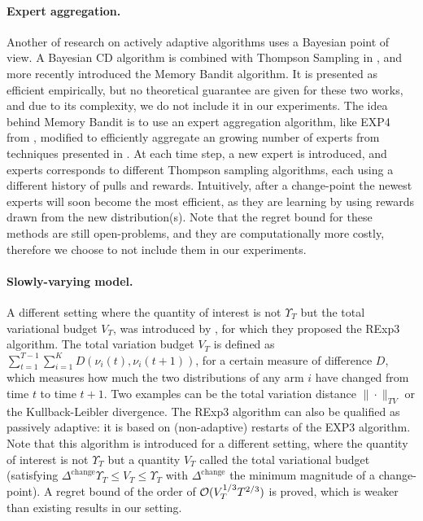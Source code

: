 \paragraph{Expert aggregation.}
%
Another of research on actively adaptive algorithms uses a Bayesian point of view.
A Bayesian CD algorithm is combined with Thompson Sampling in \cite{MellorShapiro13},
and more recently \cite{Alami17} introduced the Memory Bandit algorithm.
It is presented as efficient empirically, but no theoretical guarantee are given for these two works, and due to its complexity, we do not include it in our experiments.
The idea behind Memory Bandit is to use an expert aggregation algorithm, like EXP4 from \cite{Auer02}, modified to efficiently aggregate an growing number of experts from techniques presented in \cite{Mourtada17}.
At each time step, a new expert is introduced, and experts corresponds to different Thompson sampling algorithms, each using a different history of pulls and rewards. Intuitively, after a change-point the newest experts will soon become the most efficient, as they are learning by using rewards drawn from the new distribution(s).
%
Note that the regret bound for these methods are still open-problems,
and they are computationally more costly,
therefore we choose to not include them in our experiments.


\paragraph{Slowly-varying model.}

A different setting where the quantity of interest is not $\Upsilon_T$ but the total variational budget $V_T$, was introduced by \cite{Besbes14stochastic}, for which they proposed the RExp3 algorithm.
The total variation budget $V_T$ is defined as $\sum_{t=1}^{T-1} \sum_{i=1}^K D(\nu_i(t), \nu_i(t+1))$, for a certain measure of difference $D$, which measures how much the two distributions of any arm $i$ have changed from time $t$ to time $t+1$.
Two examples can be the total variation distance $\|\cdot\|_{TV}$ or the Kullback-Leibler divergence.
%
The RExp3 algorithm can also be qualified as passively adaptive: it is based on (non-adaptive) restarts of the EXP3 algorithm. Note that this algorithm is introduced for a different setting, where the quantity of interest is not $\Upsilon_T$ but a quantity $V_T$ called the total variational budget (satisfying $\Delta^{\text{change}} \Upsilon_T \leq V_T \leq \Upsilon_T$ with $\Delta^{\text{change}}$ the minimum magnitude of a change-point).
A regret bound of the order of $\mathcal{O}(V_T^{1/3} T^{2/3})$ is proved, which is weaker than existing results in our setting.

